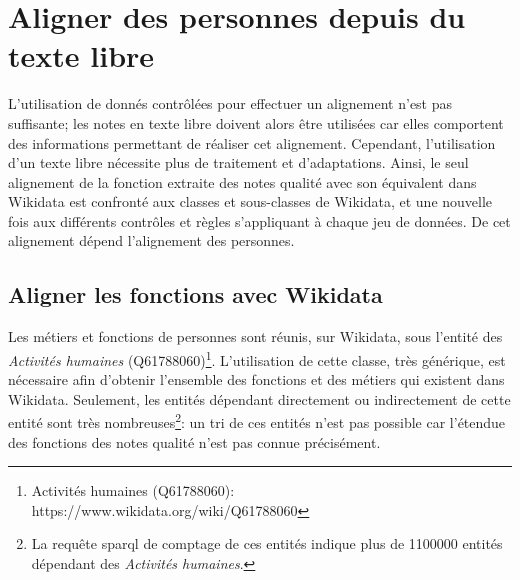 \section{\label{II-C-3}Aligner des personnes depuis du texte libre}

L'utilisation de donnés contrôlées pour effectuer un alignement n'est pas suffisante; les notes en texte libre doivent alors être utilisées car elles comportent des informations permettant de réaliser cet alignement. Cependant, l'utilisation d'un texte libre nécessite plus de traitement et d'adaptations. Ainsi, le seul alignement de la fonction extraite des notes qualité avec son équivalent dans Wikidata est confronté aux classes et sous-classes de Wikidata, et une nouvelle fois aux différents contrôles et règles s'appliquant à chaque jeu de données. De cet alignement dépend l'alignement des personnes.

\subsection{\label{II-C-3-a}Aligner les fonctions avec Wikidata}

Les métiers et fonctions de personnes sont réunis, sur Wikidata, sous l'entité des \textit{Activités humaines} (Q61788060)\footnote{Activités humaines (Q61788060): https://www.wikidata.org/wiki/Q61788060}. L'utilisation de cette classe, très générique, est nécessaire afin d'obtenir l'ensemble des fonctions et des métiers qui existent dans Wikidata. Seulement, les entités dépendant directement ou indirectement de cette entité sont très nombreuses\footnote{La requête \ac{sparql} de comptage de ces entités indique plus de 1100000 entités dépendant des \textit{Activités humaines}.}: un tri de ces entités n'est pas possible car l'étendue des fonctions des notes qualité n'est pas connue précisément.\\

